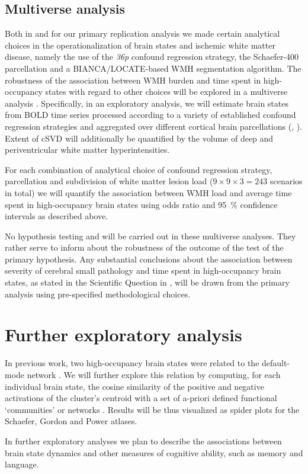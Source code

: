 \subsection{Multiverse analysis}
Both in \citep{Schlemm2022-he} and for our primary replication analysis we made certain analytical choices in the operationalization of brain states and ischemic white matter disease, namely the use of the \textit{36p} confound regression strategy, the Schaefer-\num{400} parcellation and a BIANCA/LOCATE-based WMH segmentation algorithm.
The robustness of the association between WMH burden and time spent in high-occupancy states with regard to other choices will be explored in a multiverse analysis \citep{Steegen2016-ze}. Specifically, in an exploratory analysis, we will estimate brain states from BOLD time series processed according to a variety of established confound regression strategies and aggregated over different cortical brain parcellations (, \cite{ciric2018mitigating,Ciric2017-cl}). Extent of cSVD will additionally be quantified by the volume of deep and periventricular white matter hyperintensities.



For each combination of analytical choice of confound regression strategy, parcellation and subdivision of white matter lesion load ($9\times9\times3=243$ scenarios in total) we will quantify the association between WMH load and average time spent in high-occupancy brain states using odds ratio and \qty{95}{\percent} confidence intervals as described above.

No hypothesis testing and will be carried out in these multiverse analyses. They rather serve to inform about the robustness of the outcome of the test of the primary hypothesis.
Any substantial conclusions about the association between severity of cerebral small pathology and time spent in high-occupancy brain states, as stated in the Scientific Question in , will be drawn from the primary analysis using pre-specified methodological choices.

\section{Further exploratory analysis}
In previous work, two high-occupancy brain states were related to the default-mode network \citep{Cornblath2020-fu}.
We will further explore this relation by computing, for each individual brain state, the cosine similarity of the positive and negative activations of the cluster’s centroid with a set of a-priori defined functional ‘communities’ or networks \citep{Schaefer2018-bo,Yeo2011-qg}.
Results will be thus visualized as spider plots for the Schaefer, Gordon and Power atlases.

In further exploratory analyses we plan to describe the associations between brain state dynamics and other measures of cognitive ability, such as memory and language.